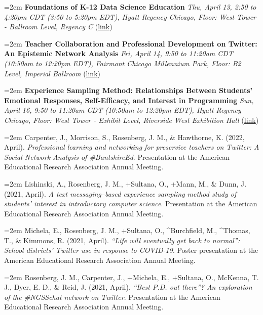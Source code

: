 \documentclass[
  14,
]{article}
\begin{document}
\hangindent=2em \textbf{Foundations of K-12 Data Science Education}
\emph{Thu, April 13, 2:50 to 4:20pm CDT (3:50 to 5:20pm EDT), Hyatt
Regency Chicago, Floor: West Tower - Ballroom Level, Regency C}
(\href{https://convention2.allacademic.com/one/aera/aera23/index.php?cmd=Online+Program+View+Session\&selected_session_id=2009288\&PHPSESSID=ioumtke7pucbovqhj69hl0moa8}{link})

\hangindent=2em \textbf{Teacher Collaboration and Professional
Development on Twitter: An Epistemic Network Analysis} \emph{Fri, April
14, 9:50 to 11:20am CDT (10:50am to 12:20pm EDT), Fairmont Chicago
Millennium Park, Floor: B2 Level, Imperial Ballroom}
(\href{https://convention2.allacademic.com/one/aera/aera23/index.php?cmd=Online+Program+View+Paper\&selected_paper_id=2002459\&PHPSESSID=ioumtke7pucbovqhj69hl0moa8}{link})

\hangindent=2em \textbf{Experience Sampling Method: Relationships
Between Students' Emotional Responses, Self-Efficacy, and Interest in
Programming} \emph{Sun, April 16, 9:50 to 11:20am CDT (10:50am to
12:20pm EDT), Hyatt Regency Chicago, Floor: West Tower - Exhibit Level,
Riverside West Exhibition Hall}
(\href{https://convention2.allacademic.com/one/aera/aera23/index.php?cmd=Online+Program+View+Event\&selected_box_id=375059\&PHPSESSID=ioumtke7pucbovqhj69hl0moa8}{link})

\hangindent=2em Carpenter, J., Morrison, S., Rosenberg, J. M., \&
Hawthorne, K. (2022, April). \emph{Professional learning and networking
for preservice teachers on Twitter: A Social Network Analysis of
\#BantshireEd}. Presentation at the American Educational Research
Association Annual Meeting.

\hangindent=2em Lishinski, A., Rosenberg, J. M., +Sultana, O., +Mann,
M., \& Dunn, J. (2021, April). \emph{A text messaging--based experience
sampling method study of students' interest in introductory computer
science}. Presentation at the American Educational Research Association
Annual Meeting.

\hangindent=2em Michela, E., Rosenberg, J. M., +Sultana, O.,
\^{}Burchfield, M., \^{}Thomas, T., \& Kimmons, R. (2021, April).
\emph{``Life will eventually get back to normal'': School districts'
Twitter use in response to COVID-19}. Poster presentation at the
American Educational Research Association Annual Meeting.

\hangindent=2em Rosenberg, J. M., Carpenter, J., +Michela, E., +Sultana,
O., McKenna, T. J., Dyer, E. D., \& Reid, J. (2021, April). \emph{``Best
P.D. out there''? An exploration of the \#NGSSchat network on Twitter}.
Presentation at the American Educational Research Association Annual
Meeting.
\end{document}
